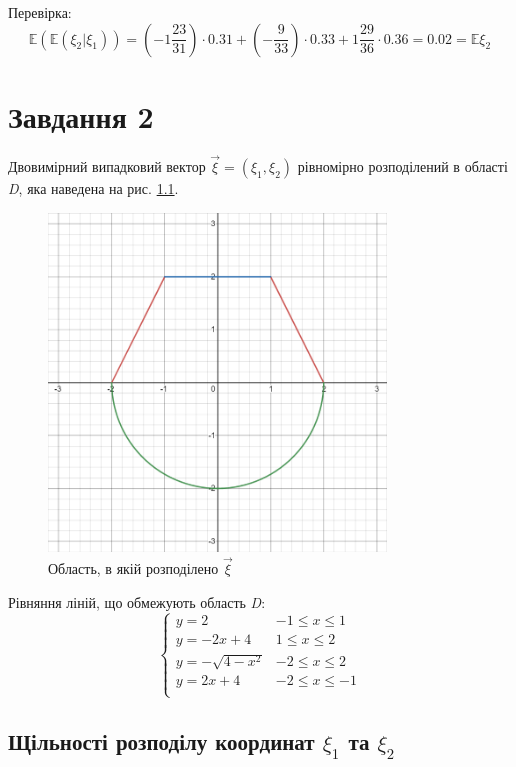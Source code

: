 \documentclass[14pt, a4paper, ukrainian]{extreport}
\begin{document}
	Перевірка:
	$$ \mathbb{E}(\mathbb{E}(\xi_2|\xi_1)) = (-1\frac{23}{31}) \cdot 0.31 + (-\frac{9}{33}) \cdot 0.33 + 1\frac{29}{36} \cdot 0.36 = 0.02 = \mathbb{E}\xi_2 $$
	
		
	\chapter{Завдання 2}
	
	Двовимірний випадковий вектор $\vec \xi = (\xi_1, \xi_2)$ рівномірно розподілений в області \textit{D}, яка наведена на рис. \ref{im:task2}.
	
	\begin{figure}[H]
		\centering
		\includegraphics[width=0.8\textwidth]{./Image/Im_05_task2.png}
		\caption{Область, в якій розподілено $\vec\xi$}
		\label{im:task2}
	\end{figure}
	
	Рівняння ліній, що обмежують область \textit{D}:
	$$\begin{cases}
		y=2 & -1 \le x \le 1\\
		y=-2x + 4 & 1 \le x \le 2\\
		y = -\sqrt{4 - x^2} & -2 \le x \le 2\\
		y=2x + 4 & -2 \le x \le -1\\
	\end{cases}$$

	\section{Щільності розподілу координат $\xi_1$ та $\xi_2$}
	
\end{document}
